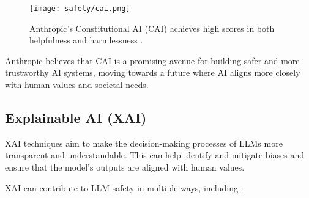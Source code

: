 \begin{figure}[H]
\centering
\texttt{[image: safety/cai.png]}
\caption{Anthropic's Constitutional AI (CAI) achieves high scores in both helpfulness and harmlessness \cite{askell2023constitutionalai}.}
\label{anthropic-cai-tradeoff}
\end{figure}

Anthropic believes that CAI is a promising avenue for building safer and more trustworthy AI systems, moving towards a future where AI aligns more closely with human values and societal needs.

\subsection{Explainable AI (XAI)}

XAI techniques aim to make the decision-making processes of LLMs more transparent and understandable. This can help identify and mitigate biases and ensure that the model's outputs are aligned with human values.

XAI can contribute to LLM safety in multiple ways, including :

